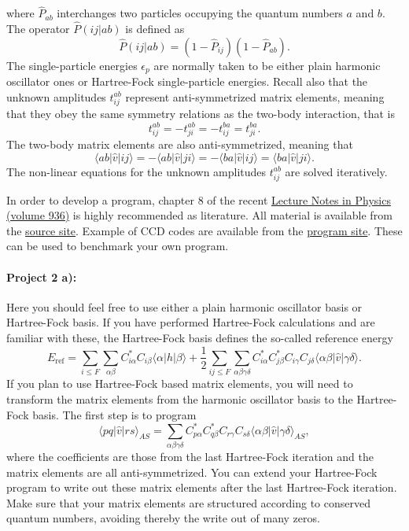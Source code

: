 \documentclass[%
oneside,                 %
final,                   %
10pt]{article}
\begin{document}
  where $\hat{P}_{ab}$ interchanges two particles occupying the
  quantum numbers $a$ and $b$.  The operator $\hat{P}(ij\vert ab)$ is
  defined as
  \[
  \hat{P}(ij\vert ab) = (1-\hat{P}_{ij})(1-\hat{P}_{ab}).
  \]
  The single-particle energies $\epsilon_p$ are normally taken to be either plain harmonic oscillator ones or Hartree-Fock single-particle energies.
  Recall also that the unknown amplitudes $t_{ij}^{ab}$ represent
  anti-symmetrized matrix elements, meaning that they obey the same
  symmetry relations as the two-body interaction, that is
  \[
  t_{ij}^{ab}=-t_{ji}^{ab}=-t_{ij}^{ba}=t_{ji}^{ba}.
  \]
  The two-body matrix elements are also anti-symmetrized, meaning that
  \[
  \langle ab \vert \hat{v} \vert ij \rangle = -\langle ab \vert
  \hat{v} \vert ji \rangle= -\langle ba \vert \hat{v} \vert ij
  \rangle=\langle ba \vert \hat{v} \vert ji \rangle.
  \]
  The non-linear equations for the unknown amplitudes $t_{ij}^{ab}$
  are solved iteratively. 

In order to develop a program, chapter 8 of the recent \href{{http://www.springer.com/us/book/9783319533353}}{Lecture Notes in Physics (volume 936)} is highly recommended as literature.
All material is available from the \href{{https://github.com/ManyBodyPhysics/LectureNotesPhysics/blob/master/doc/src/lnp.pdf}}{source site}. Example of CCD codes are available from the \href{{https://github.com/ManyBodyPhysics/LectureNotesPhysics/tree/master/Programs/Chapter8-programs/cpp/CCD}}{program site}. These can be used to benchmark your own program.

\paragraph{Project 2 a):}
Here you should feel free to use either a plain harmonic oscillator basis or Hartree-Fock basis.
If you have performed Hartree-Fock calculations and are familiar with these, the Hartree-Fock basis defines the so-called reference energy 
\begin{equation}
  E_{\mathrm{ref}} = \sum_{i\le F} \sum_{\alpha\beta}
  C^*_{i\alpha}C_{i\beta}\langle \alpha | h | \beta \rangle +
  \frac{1}{2}\sum_{ij\le F}\sum_{{\alpha\beta\gamma\delta}}
  C^*_{i\alpha}C^*_{j\beta}C_{i\gamma}C_{j\delta}\langle
  \alpha\beta|\hat{v}|\gamma\delta\rangle. 
\end{equation}
If you plan to use Hartree-Fock based matrix elements,
you will need to transform the matrix elements from the harmonic oscillator basis to the Hartree-Fock basis.
The first step is to program
\begin{equation}
  \langle pq \vert \hat{v} \vert rs\rangle_{AS}=
  \sum_{{\alpha\beta\gamma\delta}}
  C^*_{p\alpha}C^*_{q\beta}C_{r\gamma}C_{s\delta}\langle
  \alpha\beta|\hat{v}|\gamma\delta\rangle_{AS}, 
\end{equation}
where the coefficients are those from the last Hartree-Fock iteration and the matrix elements are all anti-symmetrized.
You can extend your Hartree-Fock program to write out these matrix elements after the last Hartree-Fock iteration.
Make sure that your matrix elements are structured according to conserved quantum numbers, avoiding thereby the write out of many zeros. 
\end{document}
